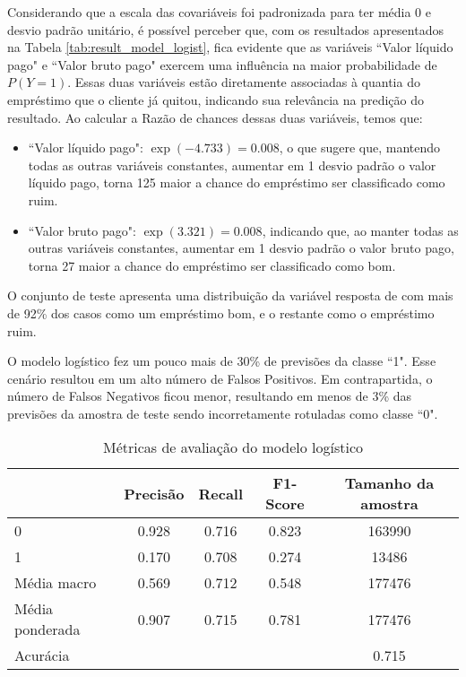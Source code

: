 Considerando que a escala das covariáveis foi padronizada para ter média 0 e desvio padrão unitário, é possível perceber que,
com os resultados apresentados na Tabela \ref{tab:result_model_logist}, fica evidente
que as variáveis ``Valor líquido pago" e ``Valor bruto pago" exercem uma influência na maior probabilidade de $P(Y=1)$.
Essas duas variáveis estão diretamente associadas à quantia do empréstimo que o cliente já quitou, 
indicando sua relevância na predição do resultado. Ao calcular a Razão de chances dessas duas variáveis, temos que:


\begin{itemize}
  \item ``Valor líquido pago": $\exp(-4.733) = 0.008$, o que sugere que, mantendo todas as outras variáveis constantes, aumentar em 1 desvio padrão o valor líquido pago, torna 125 maior a chance do empréstimo ser classificado como ruim.
  \item ``Valor bruto pago": $\exp(3.321) = 0.008$, indicando que, ao manter todas as outras variáveis constantes, aumentar em 1 desvio padrão o valor bruto pago, torna 27 maior a chance do empréstimo ser classificado como bom.
\end{itemize}



 O conjunto de teste apresenta uma distribuição da variável 
resposta de com mais de 92\% dos casos como um empréstimo bom, e o restante como o empréstimo ruim.


O modelo logístico fez um pouco mais de 30\% de previsões da classe ``1". 
Esse cenário resultou em um alto número de Falsos Positivos. 
Em contrapartida, o número de Falsos Negativos ficou menor, resultando em menos de
3\% das previsões da amostra de teste sendo incorretamente rotuladas como classe ``0".



\begin{table}[H]
\centering
\begin{tabular}{lcccc}
  \hline
                &    \textbf{Precisão} & \textbf{Recall}    &   \textbf{F1-Score} &  \textbf{Tamanho da amostra} \\
  \hline
   0               &    0.928 & 0.716    &   0.823 & 163990        \\
   1               &    0.170 & 0.708 &   0.274 & 13486        \\
   Média macro     &    0.569 & 0.712  &   0.548 & 177476        \\
   Média ponderada &    0.907 & 0.715  &   0.781 & 177476        \\
   \hline
   Acurácia     &             &           &    &  0.715\\

  \hline
\end{tabular}
\caption{Métricas de avaliação do modelo logístico}
\label{tab:report_logist_model}
\end{table}


